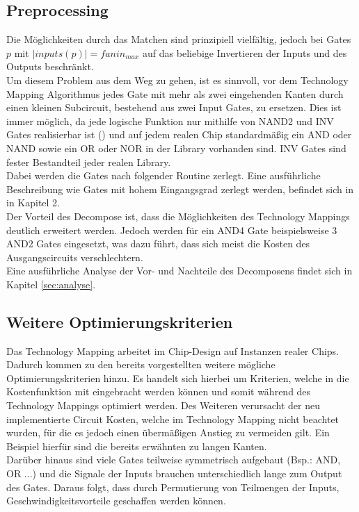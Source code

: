 \documentclass[11pt, a4paper, german]{article}
\newcommand{\TM}{Technology  Mapping }
\begin{document}
\subsection{Preprocessing}
Die Möglichkeiten durch das Matchen sind prinzipiell vielfältig, jedoch bei Gates $p$ mit $|inputs(p)| = fanin_{max}$ auf das beliebige Invertieren der Inputs und des Outputs beschränkt. \\
Um diesem Problem aus dem Weg zu gehen, ist es sinnvoll, vor dem \TM Algorithmus jedes Gate mit mehr als zwei eingehenden Kanten durch einen kleinen Subcircuit, bestehend aus zwei Input Gates, zu ersetzen. Dies ist immer möglich, da jede logische Funktion nur mithilfe von NAND2 und INV Gates realisierbar ist (\cite{Post}) und auf jedem realen Chip standardmäßig ein AND oder NAND sowie ein OR oder NOR in der Library vorhanden sind. INV Gates sind fester Bestandteil jeder realen Library.\\
Dabei werden die Gates nach folgender Routine zerlegt. Eine ausführliche Beschreibung wie Gates mit hohem Eingangsgrad zerlegt werden, befindet sich in \cite{WerberDiss} in Kapitel 2. \\
Der Vorteil des Decompose ist, dass die Möglichkeiten des Technology Mappings deutlich erweitert werden. Jedoch werden für ein AND4 Gate beispielsweise 3 AND2 Gates eingesetzt, was dazu führt, dass sich meist die Kosten des Ausgangscircuits verschlechtern.\\
Eine ausführliche Analyse der Vor- und Nachteile des Decomposens findet sich in Kapitel \ref{sec:analyse}.
	

\subsection{Weitere Optimierungskriterien}
\label{sec:weitere_opt_krit}
Das \TM arbeitet im Chip-Design auf Instanzen realer Chips. Dadurch kommen zu den bereits vorgestellten weitere mögliche Optimierungskriterien hinzu. Es handelt sich hierbei um Kriterien, welche in die Kostenfunktion mit eingebracht werden können und somit während des Technology Mappings optimiert werden. Des Weiteren verursacht der neu implementierte Circuit Kosten, welche im \TM nicht beachtet wurden, für die es jedoch einen übermäßigen Anstieg zu vermeiden gilt. Ein Beispiel hierfür sind die bereits erwähnten zu langen Kanten.\\
Darüber hinaus sind viele Gates teilweise symmetrisch aufgebaut (Bsp.: AND, OR ...) und die Signale der Inputs brauchen unterschiedlich lange zum Output des Gates. Daraus folgt, dass durch Permutierung von Teilmengen der Inputs, Geschwindigkeitsvorteile geschaffen werden können.  
\end{document}
